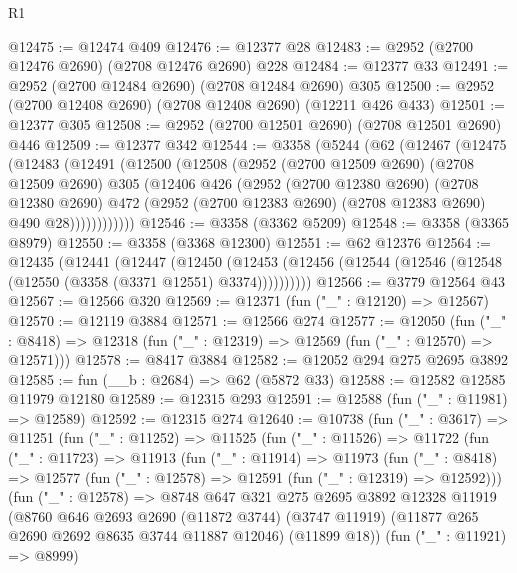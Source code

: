 \begin{lexlean}{R1}
\begin{coremodule}
@12475 := @12474 @409
@12476 := @12377 @28
@12483 := @2952 (@2700 @12476 @2690) (@2708 @12476 @2690) @228
@12484 := @12377 @33
@12491 := @2952 (@2700 @12484 @2690) (@2708 @12484 @2690) @305
@12500 := @2952 (@2700 @12408 @2690) (@2708 @12408 @2690) (@12211 @426 @433)
@12501 := @12377 @305
@12508 := @2952 (@2700 @12501 @2690) (@2708 @12501 @2690) @446
@12509 := @12377 @342
@12544 := @3358
    (@5244
      (@62
        (@12467
          (@12475
            (@12483
              (@12491
                (@12500
                  (@12508
                    (@2952
                      (@2700 @12509 @2690)
                      (@2708 @12509 @2690)
                      @305
                      (@12406
                        @426
                        (@2952
                          (@2700 @12380 @2690)
                          (@2708 @12380 @2690)
                          @472
                          (@2952 (@2700 @12383 @2690) (@2708 @12383 @2690) @490 @28))))))))))))
@12546 := @3358 (@3362 @5209)
@12548 := @3358 (@3365 @8979)
@12550 := @3358 (@3368 @12300)
@12551 := @62 @12376
@12564 := @12435
    (@12441
      (@12447
        (@12450
          (@12453 (@12456 (@12544 (@12546 (@12548 (@12550 (@3358 (@3371 @12551) @3374))))))))))
@12566 := @3779 @12564 @43
@12567 := @12566 @320
@12569 := @12371 (fun ("_" : @12120) => @12567)
@12570 := @12119 @3884
@12571 := @12566 @274
@12577 := @12050
    (fun ("_" : @8418) => @12318 (fun ("_" : @12319) => @12569 (fun ("_" : @12570) => @12571)))
@12578 := @8417 @3884
@12582 := @12052 @294 @275 @2695 @3892
@12585 := fun (__b : @2684) => @62 (@5872 @33)
@12588 := @12582 @12585 @11979 @12180
@12589 := @12315 @293
@12591 := @12588 (fun ("_" : @11981) => @12589)
@12592 := @12315 @274
@12640 := @10738
    (fun ("_" : @3617) =>
    @11251
      (fun ("_" : @11252) =>
      @11525
        (fun ("_" : @11526) =>
        @11722
          (fun ("_" : @11723) =>
          @11913
            (fun ("_" : @11914) =>
            @11973
              (fun ("_" : @8418) =>
              @12577 (fun ("_" : @12578) => @12591 (fun ("_" : @12319) => @12592)))
              (fun ("_" : @12578) =>
              @8748
                @647
                @321
                @275
                @2695
                @3892
                @12328
                @11919
                (@8760
                  @646
                  @2693
                  @2690
                  (@11872 @3744)
                  (@3747 @11919)
                  (@11877 @265 @2690 @2692 @8635 @3744 @11887 @12046)
                  (@11899 @18))
                (fun ("_" : @11921) => @8999)

\end{coremodule}
\end{lexlean}
